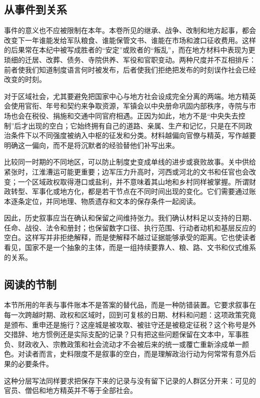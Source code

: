 \subsection{从事件到关系}
事件的意义也不应被限制在本年。本卷所见的继承、战争、改制和地方起事，都会改变下一年谁能发给军队粮食、谁能保管文书、谁能在市场和渡口征收费用。这样的后果常在本纪中被写成胜者的“安定”或败者的“叛乱”，而在地方材料中表现为更琐细的迁居、改葬、债务、寺院供养、军役和官职变动。两种尺度并不互相排斥：前者使我们知道制度语言何时被发布，后者使我们拒绝把发布的时刻误作社会已经改变的时刻。

对于区域社会，尤其要避免把国家中心与地方社会设成完全分离的两端。地方精英会使用官衔、年号和契约来争取资源，军镇会以中央册命巩固内部秩序，寺院与市场也会在税役、捐施和交通中同官府相遇。正因为如此，地方不是“中央失去控制”后才出现的空白；它始终拥有自己的道路、亲属、生产和记忆，只是在不同政治条件下以不同强度被纳入中枢的征发和分类。材料越偏向官僚与精英，写作越要明确这一偏向，而不是将沉默者的经验替他们补写出来。

比较同一时期的不同地区，可以防止制度史变成单线的进步或衰败故事。关中供给紧张时，江淮漕运可能更重要；边军压力升高时，河西或河北的文书和任官也会改变；一个区域政权取得港口或盐利，并不意味着其山地和乡村同样被掌握。所谓财政转型、军事化或地方化，都是若干节点在不同时间出现的变化。它们需要通过账本逐条定位，并同地理、物质遗存和文本的保存条件一起阅读。

因此，历史叙事应当在确认和保留之间维持张力。我们确认材料足以支持的日期、任命、战役、法令和册封；也保留数字口径、执行范围、行动者动机和基层反应的空白。这样写并非拒绝解释，而是使解释不越过证据能够承受的距离。它也使读者看见，国家不是一个抽象的主体，而是一组持续要靠人、粮、路、文书和仪式维系的关系。

\subsection{阅读的节制}
本节所用的年表与事件账本不是答案的替代品，而是一种防错装置。它要求叙事在每一次跨越时期、政权和区域时，回到可复核的日期、材料和问题：这项政策究竟是颁布、重申还是施行？这座城是被攻取、被驻守还是被稳定征税？这个称号是外交措辞、地方惯例还是实际支配的记录？只有把这些问题保留在文本中，军事胜负、财政收入、宗教政策和社会流动才不会被后来的统一或覆亡重新涂成单一颜色。对读者而言，史料限度不是叙事的空白，而是理解政治行动为何常常有意外后果的必要条件。


\noindent 这种分层写法同样要求把保存下来的记录与没有留下记录的人群区分开来：可见的官员、僧侣和地方精英并不等于全部社会。

